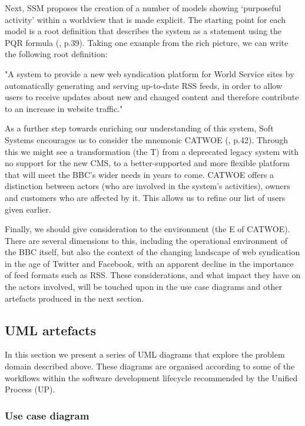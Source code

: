 \documentclass[runningheads,a4paper]{llncs}
\begin{document}
Next, SSM proposes the creation of a number of models showing `purposeful activity' within a worldview that is made explicit. The starting point for each model is a root definition that describes the system as a statement using the PQR formula (\cite{checkland2006}, p.39). Taking one example from the rich picture, we can write the following root definition:

"A system to provide a new web syndication platform for World Service sites by automatically generating and serving up-to-date RSS feeds, in order to allow users to receive updates about new and changed content and therefore contribute to an increase in website traffic."

As a further step towards enriching our understanding of this system, Soft Systems encourages us to consider the mnemonic CATWOE (\cite{checkland2006}, p.42). Through this we might see a transformation (the T) from a deprecated legacy system with no support for the new CMS, to a better-supported and more flexible platform that will meet the BBC's wider needs in years to come. CATWOE offers a distinction between actors (who are involved in the system's activities), owners and customers who are affected by it. This allows us to refine our list of users given earlier.

Finally, we should give consideration to the environment (the E of CATWOE). There are several dimensions to this, including the operational environment of the BBC itself, but also the context of the changing landscape of web syndication in the age of Twitter and Facebook, with an apparent decline in the importance of feed formats such as RSS. These considerations, and what impact they have on the actors involved, will be touched upon in the use case diagrams and other artefacts produced in the next section.


\subsection{UML artefacts}

In this section we present a series of UML diagrams that explore the problem domain described above. These diagrams are organised according to some of the workflows within the software development lifecycle recommended by the Unified Process (UP).



\subsubsection{Use case diagram}
\end{document}
